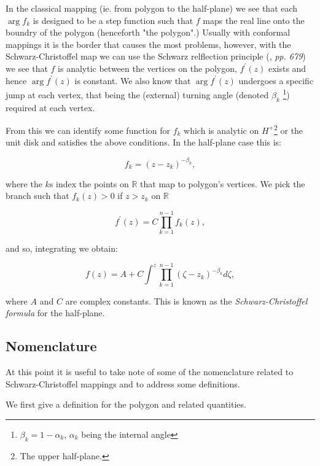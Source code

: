 \documentclass[a4paper,10pt]{amsart}
\newcommand{\sch}{Schwarz-Christoffel }
\newcommand{\fprime}{f^\prime(z)}
\begin{document}
In the classical mapping (ie. from polygon to the half-plane) we see that each $\arg f_k$ is designed to be a step function such that $f$ maps the real line onto the boundry of the polygon (henceforth "the polygon".) Usually with conformal mappings it is the border that causes the most problems, however, with the \sch map we can use the Schwarz relflection principle (\cite{handbuch}, \emph{pp. 679}) we see that $f$ is analytic between the vertices on the polygon, $\fprime$ exists and hence $\arg \fprime$ is constant. We also know that $\arg \fprime$ undergoes a specific jump at each vertex, that being the (external) turning angle (denoted $\beta_k$ \footnote{$\beta_k = 1-\alpha_k$, $\alpha_k$ being the internal angle}) required at each vertex. 

From this we can identify some function for $f_k$ which is analytic on $H^+$\footnote{The upper half-plane.} or the unit disk and satisfies the above conditions. In the half-plane case this is:

\begin{equation}
f_k = (z-z_k)^{-\beta_k},
\end{equation}

where the $k$s index the points on $\mathbb{R}$ that map to polygon's vertices. We pick the branch such that $f_k(z)>0$ if $z>z_k$ on $\mathbb{R}$

\begin{equation}
\fprime = C \prod_{k=1}^{n-1} f_k(z),
\end{equation}

and so, integrating we obtain:

\begin{equation}
f(z) = A + C \int^z \prod_{k=1}^{n-1} (\zeta-z_k)^{-\beta_k} d\zeta,
\end{equation}

where $A$ and $C$ are complex constants. This is known as the \emph{\sch formula} for the half-plane.


\subsection{Nomenclature}

At this point it is useful to take note of some of the nomenclature related to \sch mappings and to address some definitions.

We first give a definition for the polygon and related quantities.
\end{document}
